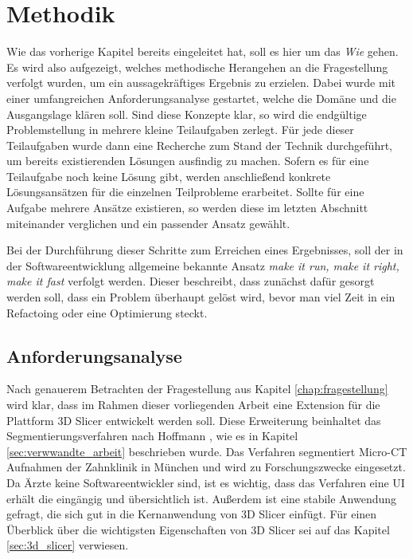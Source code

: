 \chapter{Methodik}
\label{chap:methodik} Wie das vorherige Kapitel bereits eingeleitet hat, soll es
hier um das \textit{Wie} gehen. Es wird also aufgezeigt, welches methodische Herangehen
an die Fragestellung verfolgt wurden, um ein aussagekräftiges Ergebnis zu
erzielen. Dabei wurde mit einer umfangreichen Anforderungsanalyse gestartet,
welche die Domäne und die Ausgangslage klären soll. Sind diese Konzepte klar, so
wird die endgültige Problemstellung in mehrere kleine Teilaufgaben zerlegt. Für jede
dieser Teilaufgaben wurde dann eine Recherche zum Stand der Technik durchgeführt,
um bereits existierenden Lösungen ausfindig zu machen. Sofern es für eine Teilaufgabe
noch keine Lösung gibt, werden anschließend konkrete Lösungsansätzen für die
einzelnen Teilprobleme erarbeitet. Sollte für eine Aufgabe mehrere Ansätze existieren,
so werden diese im letzten Abschnitt miteinander verglichen und ein passender
Ansatz gewählt.

Bei der Durchführung dieser Schritte zum Erreichen eines Ergebnisses, soll der in
der Softwareentwicklung allgemeine bekannte Ansatz \textit{make it run, make it right,
make it fast} verfolgt werden. Dieser beschreibt, dass zunächst dafür gesorgt
werden soll, dass ein Problem überhaupt gelöst wird, bevor man viel Zeit in ein
Refactoing oder eine Optimierung steckt.

\section{Anforderungsanalyse}
\label{sec:anforderungsanalyse} Nach genauerem Betrachten der Fragestellung aus
Kapitel \ref{chap:fragestellung} wird klar, dass im Rahmen dieser vorliegenden Arbeit
eine Extension für die Plattform 3D Slicer entwickelt werden soll. Diese
Erweiterung beinhaltet das Segmentierungsverfahren nach Hoffmann \citep[vgl.][]{hoffmann2020},
wie es in Kapitel \ref{sec:verwwandte_arbeit} beschrieben wurde. Das Verfahren segmentiert
Micro-CT Aufnahmen der Zahnklinik in München und wird zu Forschungszwecke eingesetzt.
Da Ärzte keine Softwareentwickler sind, ist es wichtig, dass das Verfahren eine
UI erhält die eingängig und übersichtlich ist. Außerdem ist eine stabile Anwendung
gefragt, die sich gut in die Kernanwendung von 3D Slicer einfügt. Für einen Überblick
über die wichtigsten Eigenschaften von 3D Slicer sei auf das Kapitel \ref{sec:3d_slicer}
verwiesen.

